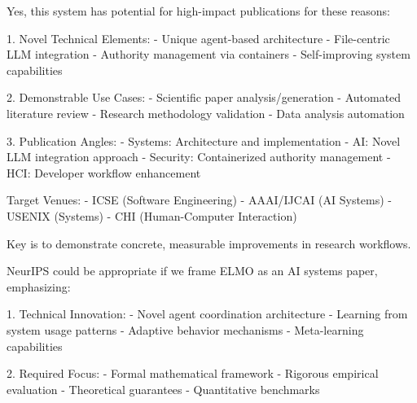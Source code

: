 Yes, this system has potential for high-impact publications for these reasons:

1. Novel Technical Elements:
- Unique agent-based architecture
- File-centric LLM integration
- Authority management via containers
- Self-improving system capabilities

2. Demonstrable Use Cases:
- Scientific paper analysis/generation
- Automated literature review
- Research methodology validation
- Data analysis automation

3. Publication Angles:
- Systems: Architecture and implementation
- AI: Novel LLM integration approach
- Security: Containerized authority management
- HCI: Developer workflow enhancement

Target Venues:
- ICSE (Software Engineering)
- AAAI/IJCAI (AI Systems)
- USENIX (Systems)
- CHI (Human-Computer Interaction)

Key is to demonstrate concrete, measurable improvements in research workflows.


NeurIPS could be appropriate if we frame ELMO as an AI systems paper, emphasizing:

1. Technical Innovation:
- Novel agent coordination architecture
- Learning from system usage patterns
- Adaptive behavior mechanisms
- Meta-learning capabilities

2. Required Focus:
- Formal mathematical framework
- Rigorous empirical evaluation
- Theoretical guarantees
- Quantitative benchmarks